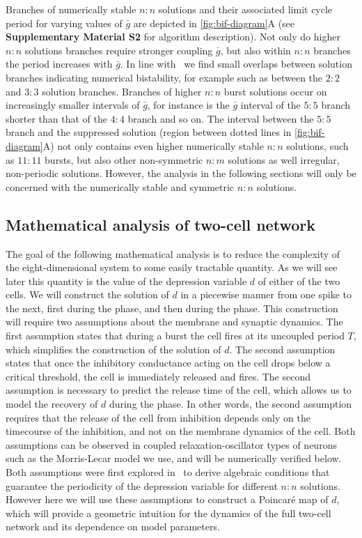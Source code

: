 Branches of numerically stable $n:n$ solutions and their associated limit cycle period for varying values of $\bar g$ are depicted in \cref{fig:bif-diagram}A (see \textbf{Supplementary Material S2} for algorithm description).
Not only do higher $n:n$ solutions branches require stronger coupling $\bar g$, but also within $n:n$ branches the period increases with $\bar g$.
In line with~\citet{bose2011} we find small overlaps between solution branches indicating numerical bistability, for example such as between the $2:2$ and $3:3$ solution branches.
Branches of higher $n:n$ burst solutions occur on increasingly smaller intervals of $\bar g$, for instance is the $\bar g$ interval of the $5:5$ branch shorter than that of the $4:4$ branch and so on.
The interval between the $5:5$ branch and the suppressed solution (region between dotted lines in \cref{fig:bif-diagram}A) not only contains even higher numerically stable $n:n$ solutions, such as $11:11$ bursts, but also other non-symmetric $n:m$ solutions as well irregular, non-periodic solutions.
However, the analysis in the following sections will only be concerned with the numerically stable and symmetric $n:n$ solutions.

\subsection{Mathematical analysis of two-cell network}
\label{sec:assumptions}
The goal of the following mathematical analysis is to reduce the complexity of the
eight-dimensional system to some easily tractable quantity.
As we will see later this quantity is the value of the depression variable $d$ of either of the two cells.
We will construct the solution of $d$ in a piecewise manner from one spike to the next, first during the \free{} phase, and then during the \suppressed{} phase.
This construction will require two assumptions about the membrane and synaptic dynamics.
The first assumption states that during a burst the \free{} cell fires at its uncoupled period $T$, which simplifies the construction of the solution of $d$.
The second assumption states that once the inhibitory conductance acting on the \suppressed{} cell drops below a critical threshold, the cell is immediately released and fires.
The second assumption is necessary to predict the release time of the \suppressed{} cell, which allows us to model the recovery of $d$ during the \suppressed{} phase.
In other words, the second assumption requires that the release of the \suppressed{} cell from inhibition depends only on the timecourse of the inhibition, and not on the membrane dynamics of the \suppressed{} cell.
Both assumptions can be observed in coupled relaxation-oscillator types of neurons such as the Morris-Lecar model we use, and will be numerically verified below.
Both assumptions were first explored in~\cite{bose2011} to derive algebraic conditions that guarantee the periodicity of the depression variable for different $n:n$ solutions.
However here we will use these assumptions to construct a Poincaré map of $d$, which will provide a geometric intuition for the dynamics of the full two-cell network and its dependence on model parameters.

